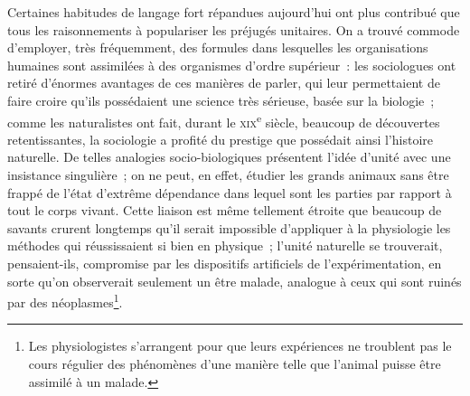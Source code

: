 \documentclass[french,twoside]{book} %
\begin{document}
Certaines habitudes de langage fort répandues aujourd’hui ont plus contribué que tous les raisonnements à populariser les préjugés unitaires. On a trouvé commode d’employer, très fréquemment, des formules dans lesquelles les organisations humaines sont assimilées à des organismes d’ordre supérieur : les sociologues ont retiré d’énormes avantages de ces manières de parler, qui leur permettaient de faire croire qu’ils possédaient une science très sérieuse, basée sur la biologie ; comme les naturalistes ont fait, durant le {\scshape xix}\textsuperscript{e} siècle, beaucoup de découvertes retentissantes, la sociologie a profité du prestige que possédait ainsi l’histoire naturelle. De telles  analogies socio-biologiques présentent l’idée d’unité avec une insistance singulière ; on ne peut, en effet, étudier les grands animaux sans être frappé de l’état d’extrême dépendance dans lequel sont les parties par rapport à tout le corps vivant. Cette liaison est même tellement étroite que beaucoup de savants crurent longtemps qu’il serait impossible d’appliquer à la physiologie les méthodes qui réussissaient si bien en physique ; l’unité naturelle se trouverait, pensaient-ils, compromise par les dispositifs artificiels de l’expérimentation, en sorte qu’on observerait seulement un être malade, analogue à ceux qui sont ruinés par des néoplasmes\footnote{ \noindent Les physiologistes s’arrangent pour que leurs expériences ne troublent pas le cours régulier des phénomènes d’une manière telle que l’animal puisse être assimilé à un malade.
 }.\par
\end{document}
